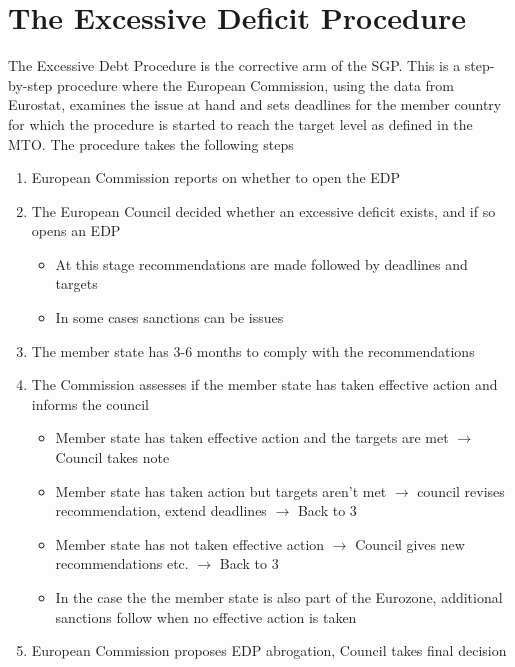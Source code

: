 \documentclass{tufte-handout}
\begin{document}
\section{The Excessive Deficit Procedure}
The Excessive Debt Procedure is the corrective arm of the SGP.
This is a step-by-step procedure where the European Commission, using the data from Eurostat, examines the issue at hand and sets deadlines for the member country for which the procedure is started to reach the target level as defined in the MTO. 
The procedure takes the following steps
\begin{enumerate}
  \item European Commission reports on whether to open the EDP
  \item The European Council decided whether an excessive deficit exists, and if so opens an EDP
  \begin{itemize}
    \item At this stage recommendations are made followed by deadlines and targets
    \item In some cases sanctions can be issues
  \end{itemize}
  \item The member state has 3-6 months to comply with the recommendations
  \item The Commission assesses if the member state has taken effective action and informs the council
  \begin{itemize}
    \item Member state has taken effective action and the targets are met $\rightarrow$ Council takes note
    \item Member state has taken action but targets aren't met $\rightarrow$ council revises recommendation, extend deadlines $\rightarrow$ Back to 3 
    \item Member state has not taken effective action $\rightarrow$ Council gives new recommendations etc. $\rightarrow$ Back to 3
    \item In the case the the member state is also part of the Eurozone, additional sanctions follow when no effective action is taken
  \end{itemize}
  \item European Commission proposes EDP abrogation, Council takes final decision
\end{enumerate}
\clearpage
\end{document}
